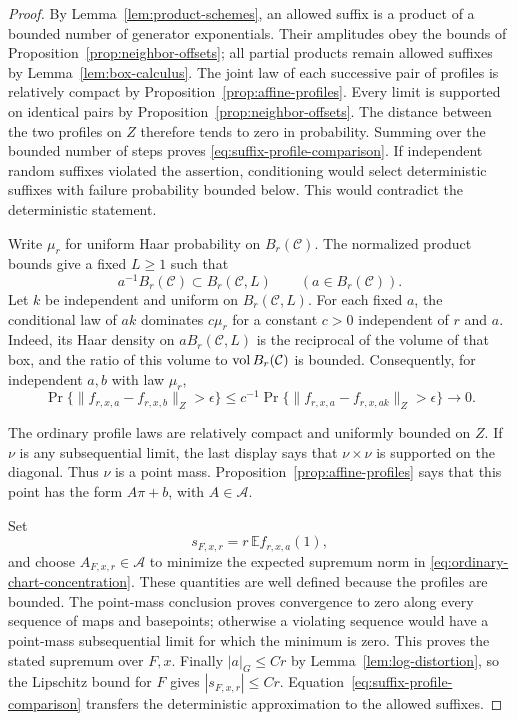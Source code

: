 \begin{proof}
By Lemma~\ref{lem:product-schemes}, an allowed suffix is a product
of a bounded number of generator exponentials.  Their amplitudes obey
the bounds of Proposition~\ref{prop:neighbor-offsets}; all partial
products remain allowed suffixes by Lemma~\ref{lem:box-calculus}.
The joint law of each successive pair of profiles is relatively
compact by Proposition~\ref{prop:affine-profiles}.  Every limit is
supported on identical pairs by Proposition~\ref{prop:neighbor-offsets}.
The distance between the two profiles on $Z$ therefore tends to zero
in probability.  Summing over the bounded number of steps proves
\eqref{eq:suffix-profile-comparison}.  If independent random suffixes
violated the assertion, conditioning would select deterministic
suffixes with failure probability bounded below.  This would contradict
the deterministic statement.

Write $\mu_r$ for uniform Haar probability on $B_r(\mathcal C)$.
The normalized product bounds give a fixed $L\ge1$ such that
\[
 a^{-1}B_r(\mathcal C)\subset B_r(\mathcal C,L)
 \qquad(a\in B_r(\mathcal C)).
\]
Let $k$ be independent and uniform on $B_r(\mathcal C,L)$.
For each fixed $a$, the conditional law of $ak$ dominates $c\mu_r$
for a constant $c>0$ independent of $r$ and $a$.  Indeed, its Haar
density on $aB_r(\mathcal C,L)$ is the reciprocal of the volume of
that box, and the ratio of this volume to $\operatorname{vol} B_r(\mathcal C)$
is bounded.  Consequently, for independent $a,b$ with law $\mu_r$,
\[
 \Pr\{\|f_{r,x,a}-f_{r,x,b}\|_Z>\epsilon\}
 \le c^{-1}
 \Pr\{\|f_{r,x,a}-f_{r,x,ak}\|_Z>\epsilon\}
 \longrightarrow0.
\]

The ordinary profile laws are relatively compact and uniformly bounded
on $Z$.  If $\nu$ is any subsequential limit, the last display says that
$\nu\times\nu$ is supported on the diagonal.  Thus $\nu$ is a point
mass.  Proposition~\ref{prop:affine-profiles} says that this point has
the form $A\pi+b$, with $A\in\mathcal A$.

Set
\[
 s_{F,x,r}=r\,\mathbb E f_{r,x,a}(1),
\]
and choose $A_{F,x,r}\in\mathcal A$ to minimize the expected supremum
norm in \eqref{eq:ordinary-chart-concentration}.  These quantities
are well defined because the profiles are bounded.  The point-mass
conclusion proves convergence to zero along every sequence of maps
and basepoints; otherwise a violating sequence would have a
point-mass subsequential limit for which the minimum is zero.
This proves the stated supremum over $F,x$.
Finally $|a|_G\le Cr$ by Lemma~\ref{lem:log-distortion}, so the
Lipschitz bound for $F$ gives $|s_{F,x,r}|\le Cr$.
Equation~\eqref{eq:suffix-profile-comparison} transfers the deterministic
approximation to the allowed suffixes.
\end{proof}

